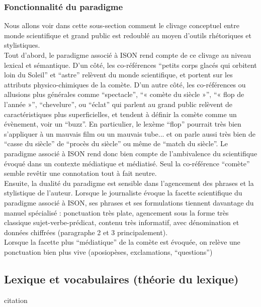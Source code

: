 \documentclass[a4paper,10pt]{article}
\begin{document}
		\subsubsection{Fonctionnalité du paradigme}
			Nous allons voir dans cette sous-section comment le clivage conceptuel entre monde scientifique et grand public est redoublé au moyen d'outils rhétoriques et stylistiques.\\
			Tout d'abord, le paradigme associé à ISON rend compte de ce clivage au niveau lexical et sémantique. D'un côté, les co-références ``petits corps glacés qui orbitent loin du Soleil'' et ``astre'' relèvent du monde scientifique, et portent sur les attributs physico-chimiques de la comète. D'un autre côté, les co-références ou allusions plus générales comme ``spectacle'', ``« comète du siècle »'', ``« flop de l'année »'', ``chevelure'', ou ``éclat'' qui parlent au grand public relèvent de caractéristiques plus superficielles, et tendent à définir la comète comme un évènement, voir un ``buzz''. En particulier, le lexème ``flop'' pourrait très bien s'appliquer à un mauvais film ou un mauvais tube... et on parle aussi très bien de ``casse du siècle'' de ``procès du siècle'' ou même de ``match du siècle''. Le paradigme associé à ISON rend donc bien compte de l'ambivalence du scientifique évoqué dans un contexte médiatique et médiatisé. Seul la co-référence ``comète'' semble revêtir une connotation tout à fait neutre.\\
			
			Ensuite, la dualité du paradigme est sensible dans l'agencement des phrases et la stylistique de l'auteur. Lorsque le journaliste évoque la facette scientifique du paradigme associé à ISON, ses phrases et ses formulations tiennent davantage du manuel spécialisé : ponctuation très plate, agencement sous la forme très classique sujet-verbe-prédicat, contenu très informatif, avec dénomination et données chiffrées (paragraphe 2 et 3 principalement).\\
			Lorsque la facette plus ``médiatique'' de la comète est évoquée, on relève une ponctuation bien plus vive (aposiopèses, exclamations, ``questions'')
	\subsection{Lexique et vocabulaires (théorie du lexique)}






\begin{center}
	\footnotesize
	\begin{minipage}{0.7\textwidth}
		citation
	\end{minipage}
\end{center}
\medskip




\end{document}

